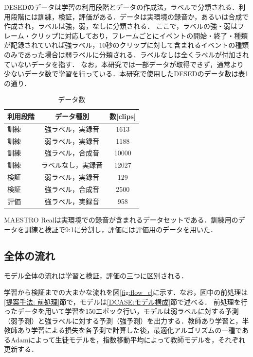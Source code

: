 \documentclass[main]{subfiles}
\begin{document}
DESEDのデータは学習の利用段階とデータの作成法，ラベルで分類される．利用段階には訓練，検証，評価がある．データは実環境の録音か，あるいは合成で作成され，ラベルは強，弱，なしに分類される．
ここで，ラベルの強・弱はフレーム・クリップに対応しており，フレームごとにイベントの開始・終了・種類が記録されていれば強ラベル，10秒のクリップに対して含まれるイベントの種類のみであった場合は弱ラベルに分類される．ラベルなしは全くラベルが付加されていないデータを指す．
なお，本研究では一部データが取得できず，通常より少ないデータ数で学習を行っている．本研究で使用したDESEDのデータ数は表\ref{table:desed}の通り．\par
\begin{table}[htbp]
 \begin{center}
   \begin{tabular}{|l|c|c|}
    \hline
    利用段階 & データ種別  & 数[clips] \\
    \hline
    訓練 & 強ラベル，実録音 & 1613 \\
    訓練 & 弱ラベル，実録音 & 1188 \\
    訓練 & 強ラベル，合成音 & 10000 \\
    訓練 & ラベルなし，実録音 & 12027 \\
    検証 & 弱ラベル，実録音 & 129 \\
    検証 & 強ラベル，合成音 & 2500 \\
    評価 & 強ラベル，実録音  & 958 \\
    \hline
  \end{tabular}
  \caption{データ数}
  \label{table:desed}
\end{center}
\end{table}

MAESTRO Realは実環境での録音が含まれるデータセットである．訓練用のデータを訓練と検証で9:1に分割し，評価には評価用のデータを用いた．

\clearpage

\subsection{全体の流れ}
モデル全体の流れは学習と検証，評価の三つに区別される．\par
学習から検証までの大まかな流れを図\ref{fig:flow_c}に示す．なお，図中の前処理は\ref{提案手法: 前処理}節で，モデルは\ref{DCASE:モデル構成}節で述べる．
前処理を行ったデータを用いて学習を150エポック行い，モデルは弱ラベルに対する予測（弱予測）と強ラベルに対する予測（強予測）を出力する．教師あり学習と，半教師あり学習による損失を各予測で計算した後，最適化アルゴリズムの一種であるAdam\cite{kingma2014adam}によって生徒モデルを，指数移動平均によって教師モデルを，それぞれ更新する．\par
\end{document}
